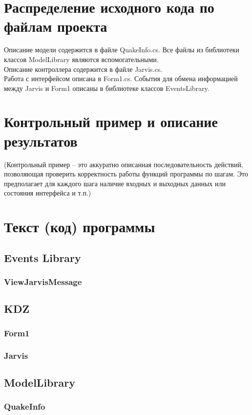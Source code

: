 \documentclass[a4paper,12pt, fleqn]{article}
\theoremstyle{plain} %
\theoremstyle{definition} %
\theoremstyle{remark} %
\numberwithin{equation}{section}
\begin{document}
\section{Распределение исходного кода по файлам проекта}
Описание модели содержится в файле QuakeInfo.cs. Все файлы из библиотеки классов ModelLibrary являются вспомогательными.\\
Описание контроллера содержится в файле Jarvis.cs.\\
Работа с интерфейсом описана в Form1.cs.
События для обмена информацией между Jarvis и Form1 описаны в библиотеке классов EventsLibrary.


\section{Контрольный пример и описание результатов}
(Контрольный пример – это аккуратно описанная последовательность действий, позволяющая проверить корректность работы функций программы по шагам. Это предполагает для каждого шага наличие входных и выходных данных или состояния интерфейса и т.п.)


\section{Текст (код) программы}
\subsection{Events Library}
\subsubsection{ViewJarvisMessage}

\subsection{KDZ}
\subsubsection{Form1}

\subsubsection{Jarvis}

\subsection{ModelLibrary}
\subsubsection{QuakeInfo}

\end{document}
